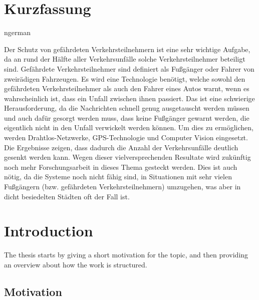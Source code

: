 \documentclass[]{ccs-thesis}
\begin{document}
\chapter*{Kurzfassung}
\begin{otherlanguage*}{ngerman}

Der Schutz von gefährdeten Verkehrsteilnehmern ist eine sehr wichtige Aufgabe, da an rund der Hälfte aller Verkehrsunfälle solche Verkehrsteilnehmer beteiligt sind. Gefährdete Verkehrsteilnehmer sind definiert als Fußgänger oder Fahrer von zweirädigen Fahrzeugen. Es wird eine Technologie benötigt, welche sowohl den gefährdeten Verkehrsteilnehmer als auch den Fahrer eines Autos warnt, wenn es wahrscheinlich ist, dass ein Unfall zwischen ihnen passiert. Das ist eine schwierige Herausforderung, da die Nachrichten schnell genug ausgetauscht werden müssen und auch dafür gesorgt werden muss, dass keine Fußgänger gewarnt werden, die eigentlich nicht in den Unfall verwickelt werden können. Um dies zu ermöglichen, werden Drahtlos-Netzwerke, GPS-Technologie und Computer Vision eingesetzt. Die Ergebnisse zeigen, dass dadurch die Anzahl der Verkehrsunfälle deutlich gesenkt werden kann. Wegen dieser vielversprechenden Resultate wird zukünftig noch mehr Forschungsarbeit in dieses Thema gesteckt werden. Dies ist auch nötig, da die Systeme noch nicht fähig sind, in Situationen mit sehr vielen Fußgängern (bzw. gefährdeten Verkehrsteilnehmern) umzugehen, was aber in dicht besiedelten Städten oft der Fall ist.


\end{otherlanguage*}
\acresetall

\cleardoublepage
\tableofcontents

\cleardoublepage
{}



\chapter{Introduction}
\label{chap:introduction}

The thesis starts by giving a short motivation for the topic, and then providing an overview about how the work is structured.

\section{Motivation}
\label{sec:motivation}
\end{document}
